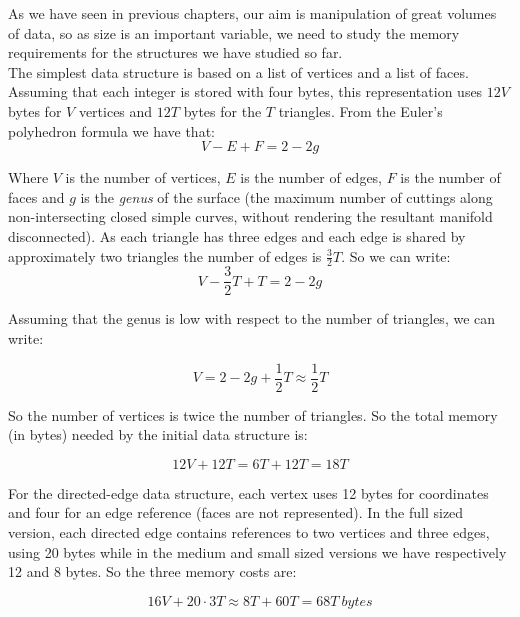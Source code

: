 As we have seen in previous chapters, our aim is manipulation of great volumes of data, so as size is an important variable, we need to study the memory requirements for the structures we have studied so far.\\

The simplest data structure is based on a list of vertices and a list of faces. Assuming that each integer is stored with four bytes, this representation uses $12V$ bytes for $V$ vertices and $12T$ bytes for the $T$ triangles. From the Euler's polyhedron formula we have that:
\begin{equation}
 V - E + F = 2 - 2g
\end{equation}

Where $V$ is the number of vertices, $E$ is the number of edges, $F$ is the number of faces and $g$ is the \textit{genus} of the surface (the maximum number of cuttings along non-intersecting closed simple curves, without rendering the resultant manifold disconnected). As each triangle has three edges and each edge is shared by approximately two triangles the number of edges is $\frac{3}{2}T$. So we can write:
\begin{equation}
 V - \frac{3}{2}T + T = 2 - 2g
\end{equation}

Assuming that the genus is low with respect to the number of triangles, we can write:

\begin{equation}
 V = 2 - 2g + \frac{1}{2}T \approx \frac{1}{2}T
\end{equation}

So the number of vertices is twice the number of triangles. So the total memory (in bytes) needed by the initial data structure is:

\begin{equation}
 12V + 12T = 6T + 12T = 18T
\end{equation}

For the directed-edge data structure, each vertex uses 12 bytes for coordinates and four for an edge reference (faces are not represented). In the full sized version, each directed edge contains references to two vertices and three edges, using 20 bytes while in the medium and small sized versions we have respectively 12 and 8 bytes. So the three memory costs are:

\begin{equation}
 16V + 20\cdot 3 T \approx 8 T + 60 T = 68 T \: bytes
\end{equation}


